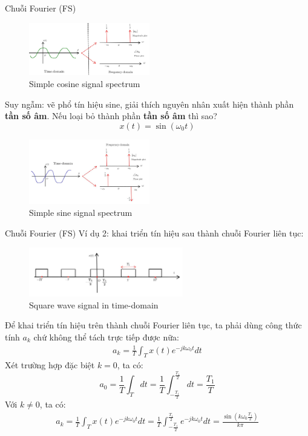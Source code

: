 \documentclass[8pt]{beamer}
\begin{document}
\begin{frame}{Chuỗi Fourier (FS)}
\begin{figure}[h]
			\includegraphics[width=0.47\textwidth]{fre.jpg}
			\caption{Simple cosine signal spectrum}\label{fig:re11}

		\end{figure}

		Suy ngẫm: vẽ phổ tín hiệu sine, giải thích nguyên nhân xuất hiện thành phần \textbf{tần số âm}. Nếu loại bỏ thành phần \textbf{tần số âm} thì sao? 
$$x(t)=\sin{(\omega_{0}t)}$$
\begin{figure}[h]
			\includegraphics[width=0.47\textwidth]{sine.jpg}
			\caption{Simple sine signal spectrum}\label{fig:re11}

		\end{figure}


\end{frame}
\begin{frame}{Chuỗi Fourier (FS)}
Ví dụ 2: khai triển tín hiệu sau thành chuỗi Fourier liên tục:
\begin{figure}[h]
			\includegraphics[width=0.6\textwidth]{square.jpg}
			\caption{Square wave signal in time-domain}\label{fig:re11}

		\end{figure}
		Để khai triển tín hiệu trên thành chuỗi Fourier liên tục, ta phải dùng công thức tính $a_{k}$ chứ không thể tách trực tiếp được nữa:
\begin{equation*}
\begin{split}
a_{k}=\frac{1}{T}\int_{T}x(t)e^{-jk\omega_{0}t}dt
\end{split}
\end{equation*}
Xét trường hợp đặc biệt $k=0$, ta có: $$a_{0}=\frac{1}{T}\int_{T}dt=\frac{1}{T}\int_{-\frac{T_{1}}{2}}^{\frac{T_{1}}{2}}dt=\frac{T_{1}}{T}$$
Với $k\neq 0$, ta có:
\begin{equation*}
	\begin{split}
		a_{k}=\frac{1}{T}\int_{T}x(t)e^{-jk\omega_{0}t}dt=\frac{1}{T}\int_{-\frac{T_{1}}{2}}^{\frac{T_{1}}{2}}e^{-jk\omega_{0}t}dt=\frac{\sin{\left(k\omega_{0}\frac{T_{1}}{2}\right)}}{k\pi}
\end{split}
\end{equation*}
\end{frame}
\end{document}
